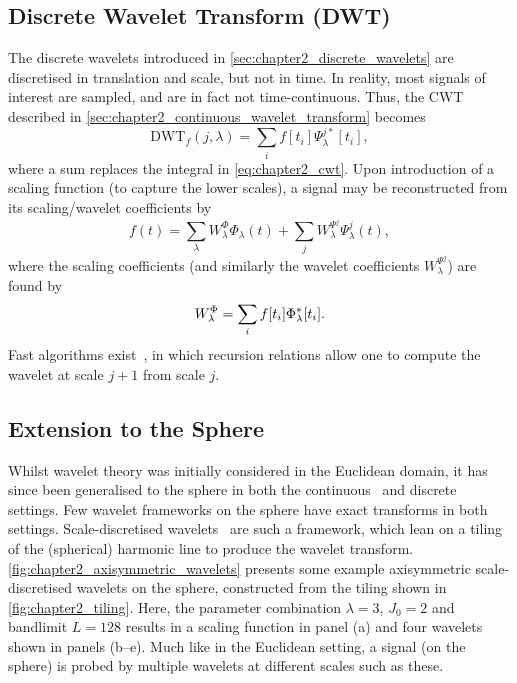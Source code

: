 \subsection{Discrete Wavelet Transform (DWT)}

The discrete wavelets introduced in \cref{sec:chapter2_discrete_wavelets} are discretised in translation and scale, but not in time.
In reality, most signals of interest are sampled, and are in fact not time-continuous.
Thus, the CWT described in \cref{sec:chapter2_continuous_wavelet_transform} becomes
%
\begin{equation}
	\text{DWT}_{f}(j,\lambda)
	= \sum\limits_{i} f[t_{i}] \Psi^{j\ast}_{\lambda}[t_{i}],
\end{equation}
%
where a sum replaces the integral in \cref{eq:chapter2_cwt}.
Upon introduction of a scaling function (to capture the lower scales), a signal may be reconstructed from its scaling/wavelet coefficients by
%
\begin{equation}
	f(t)
	= \sum\limits_{\lambda} W^{\Phi}_{\lambda} \Phi_{\lambda}(t)
	+ \sum\limits_{j} W^{\Psi^{j}}_{\lambda} \Psi^{j}_{\lambda}(t),
\end{equation}
%
where the scaling coefficients (and similarly the wavelet coefficients \(W^{\Psi^{j}}_{\lambda}\)) are found by
%
\begin{equation}
	W^{\Phi}_{\lambda}
	= \sum\limits_{i} f[t_{i}] \Phi^{\ast}_{\lambda}[t_{i}].
\end{equation}
%
Fast algorithms exist~\cite{Beylkin1991,Rioul1992}, in which recursion relations allow one to compute the wavelet at scale \(j+1\) from scale \(j\).

\subsection{Extension to the Sphere}\label{sec:chapter2_extension_sphere}

Whilst wavelet theory was initially considered in the Euclidean domain, it has since been generalised to the sphere in both the continuous~\cite{Torresani1995,Holschneider1996,Freeden1997,Antoine1998,Antoine1999,Antoine2002,Demanet2003,Wiaux2005,Sanz2006,McEwen2006} and discrete~\cite{Sweldens1996,Schroder2000,Wiaux2005,Starck2006,Wiaux2008,Starck2009,Leistedt2013,McEwen2019,McEwen2018} settings.
Few wavelet frameworks on the sphere have exact transforms in both settings.
Scale-discretised wavelets~\cite{Wiaux2008,McEwen2018,Leistedt2013,McEwen2013,McEwen2015} are such a framework, which lean on a tiling of the (spherical) harmonic line to produce the wavelet transform.
\cref{fig:chapter2_axisymmetric_wavelets} presents some example axisymmetric scale-discretised wavelets on the sphere, constructed from the tiling shown in \cref{fig:chapter2_tiling}.
Here, the parameter combination \(\lambda=3\), \(J_{0}=2\) and bandlimit \(L=128\) results in a scaling function in panel (a) and four wavelets shown in panels (b--e). %
Much like in the Euclidean setting, a signal (on the sphere) is probed by multiple wavelets at different scales such as these.

